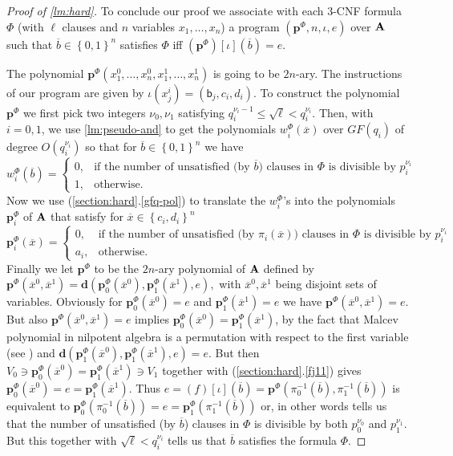 \documentclass[11pt,a4paper]{amsart}
\newcommand{\m}[1]{{\uppercase {\bf{#1}}}}
\newcommand{\set}[1]{{\left\{ {#1} \right\} }}
\renewcommand{\leq}{\leqslant}
\newcommand{\po}[1]{{\mathbf {#1}}}
\renewcommand{\o}[1]{\overline {#1}}
\newcommand{\ee}{e}
\newcommand{\cci}{c_i}
\newcommand{\ddi}{d_i}
\newcommand{\progg}[4]{\left(#1,#2,#3,#4\right)}
\newcommand{\prog}[2]{\left(#1\right)\!\left[#2\right]}
\renewcommand{\b}{\textsf{b}}
\newcommand{\true}{1}
\newcommand{\false}{0}
\newcommand{\bool}{\set{\false,\true}}
\begin{document}
\begin{proof}[Proof of \cref{lm:hard}]
\medskip
To conclude our proof we associate with each 3-CNF formula
$\Phi$ (with $\ell$ clauses and $n$ variables $x_1,\ldots,x_n$)
a program $\progg{\po p^\Phi}{n}{\iota}{\ee}$ over $\m A$ such that $\o b\in\bool^n$ satisfies $\Phi$ iff
$\prog{\po p^\Phi}{\iota}(\o b)=\ee$.

The polynomial $\po p^\Phi(x_1^0,\ldots,x_n^0,x_1^1,\ldots,x_n^1)$ is going to be $2n$-ary.
The instructions of our program are given by
\(
\iota(x_j^i)=(\b_j, c_i, d_i).
\)
To construct the polynomial $\po p^\Phi$ we first pick two integers $\nu_0,\nu_1$
satisfying
\(
q_i^{\nu_i-1}\leq\sqrt{\ell}<q_i^{\nu_i}.
\)
Then, with $i=0,1$, we use \cref{lm:pseudo-and} to get the polynomials
$w^\Phi_i(\o x)$ over $GF(q_i)$ of degree $O(q_i^{\nu_i})$
so that for $\o b\in\bool^n$ we have
\[
w^\Phi_{i}(\o b) =
\left\{
\begin{array}{ll}
0, &\mbox{if the number of unsatisfied (by $\o b$) clauses in $\Phi$ is divisible by $p_i^{\nu_i}$}\\
1, &\mbox{otherwise.}
\end{array}
\right.
\]
Now we use (\ref{section:hard}.\ref{gfq-pol}) to translate the $w^\Phi_{i}$'s
into the polynomials $\po p^\Phi_{i}$ of $\m A$
that satisfy for $\o x\in\set{\cci,\ddi}^n$
\[
\po p^\Phi_{i}(\o x) =
\left\{
\begin{array}{ll}
0, &\mbox{if the number of unsatisfied (by $\pi_i(\o x)$) clauses in $\Phi$ is divisible by $p_i^{\nu_i}$}\\
a_i, &\mbox{otherwise.}
\end{array}
\right.
\]
Finally we let $\po p^\Phi$ to be the $2n$-ary polynomial of $\m A$ defined by
\(
\po p^\Phi(\o x^0,\o x^1)=\po d(\po p^\Phi_{0}(\o x^0),\po p^\Phi_{1}(\o x^1),\ee),
\)
with $\o x^0,\o x^1$ being disjoint sets of variables.
Obviously for $\po p^\Phi_{0}(\o x^0)=\ee$ and $\po p^\Phi_{1}(\o x^1)=\ee$
we have $\po p^\Phi(\o x^0,\o x^1)=\ee$.
But also $\po p^\Phi(\o x^0,\o x^1)=\ee$ implies $\po p^\Phi_{0}(\o x^0)=\po p^\Phi_{1}(\o x^1)$,
by the fact that Malcev polynomial in nilpotent algebra is a permutation
with respect to the first variable (see \cite[Lemma 7.3]{fm}) and
$\po d(\po p^\Phi_{1}(\o x^0),\po p^\Phi_{1}(\o x^1),\ee)=\ee$.
But then
\(
V_0\ni \po p^\Phi_{0}(\o x^0)=\po p^\Phi_{1}(\o x^1)\ni V_1
\)
together with (\ref{section:hard}.\ref{fj11}) gives
$\po p^\Phi_{0}(\o x^0)=\ee=\po p^\Phi_{1}(\o x^1)$.
Thus
\(
\ee = \prog{f}{\iota}(\o b) = \po p^\Phi(\pi_0^{-1}(\o b),\pi_1^{-1}(\o b))
\)
is equivalent to
$\po p^\Phi_{0}(\pi_0^{-1}(\o b))=\ee=\po p^\Phi_{1}(\pi_1^{-1}(\o b))$
or, in other words tells us that the number of unsatisfied (by $\o b$) clauses in $\Phi$
is divisible by both $p_0^{\nu_0}$ and $p_1^{\nu_1}$.
But this together with $\sqrt{\ell}<q_i^{\nu_i}$
tells us that $\o b$ satisfies the formula $\Phi$.


\end{proof}
\end{document}
